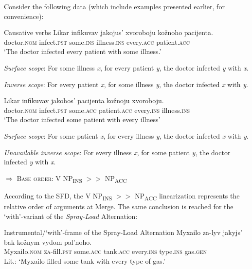 \documentclass[output=paper,colorlinks,citecolor=brown]{langscibook}
\begin{document}
  \largerpage
Consider the following data (which include examples presented earlier, for convenience):

\ea%
    \label{ex:antonyuk:21}
Causative verbs
\ea \gll   Likar   infikuvav   jakojus’ xvoroboju   kožnoho pacijenta.\\
  doctor.\textsc{nom} infect.\textsc{pst}  some.\textsc{ins} illness.\textsc{ins}  every.\textsc{acc} patient.\textsc{acc}\\
\glt `The doctor infected every patient with some illness.’

\textit{Surface scope}: For some illness \textit{x}, for every patient \textit{y}, the doctor infected \textit{y} with \textit{x}.

\textit{Inverse scope}: For every patient \textit{x}, for some illness \textit{y}, the doctor infected \textit{x} with \textit{y}.

\ex
\gll   Likar   infikuvav   jakohos’ pacijenta   kožnoju xvoroboju.\\
  doctor.\textsc{nom} infect.\textsc{pst}  some.\textsc{acc} patient.\textsc{acc}  every.\textsc{ins} illness.\textsc{ins}\\
\glt `The doctor infected some patient with every illness’

\textit{Surface scope}: For some patient \textit{x}, for every illness \textit{y}, the doctor infected \textit{x} with \textit{y}.

\textit{Unavailable inverse scope}: For every illness \textit{x}, for some patient \textit{y}, the doctor infected \textit{y} with \textit{x}.

\z 
$\Rightarrow$ \textsc{Base order}:  V NP\textsubscript{INS} $>>$ NP\textsubscript{ACC}
\z

\noindent According to the SFD, the V NP\textsubscript{INS} $>>$ NP\textsubscript{ACC} linearization represents the relative order of arguments at Merge. The same conclusion is reached for the `with'-variant of the \textit{Spray-Load} Alternation:



\ea%
    \label{ex:antonyuk:22}
Instrumental/`with'-frame of the Spray-Load Alternation
\ea
\gll    Myxailo   za-lyv     jakyjs’ bak   kožnym vydom pal’noho.\\
  Myxailo.\textsc{nom}   \textsc{za}-fill.\textsc{pst}  some.\textsc{acc} tank.\textsc{acc}   every.\textsc{ins} type.\textsc{ins} gas.\textsc{gen}\\
 \glt Lit.: ‘Myxailo filled some tank with every type of gas.’
\end{document}
